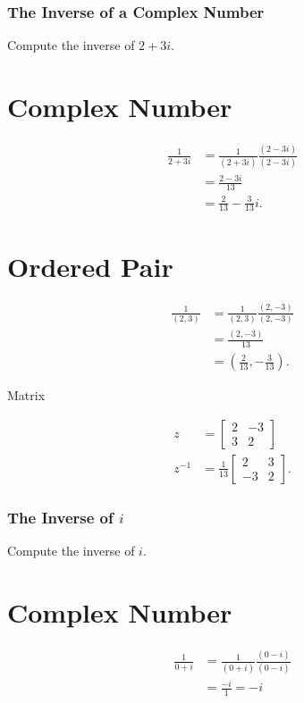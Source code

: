 \documentclass[10pt]{article}
\begin{document}
\subsubsection{The Inverse of a Complex Number}
Compute the inverse of $2+3 i$.

\section{Complex Number}
$$
\begin{aligned}
\frac{1}{2+3 i} & =\frac{1}{(2+3 i)} \frac{(2-3 i)}{(2-3 i)} \\
& =\frac{2-3 i}{13} \\
& =\frac{2}{13}-\frac{3}{13} i .
\end{aligned}
$$

\section{Ordered Pair}
$$
\begin{aligned}
\frac{1}{(2,3)} & =\frac{1}{(2,3)} \frac{(2,-3)}{(2,-3)} \\
& =\frac{(2,-3)}{13} \\
& =\left(\frac{2}{13},-\frac{3}{13}\right) .
\end{aligned}
$$

Matrix

$$
\begin{aligned}
z & =\left[\begin{array}{lc}
2 & -3 \\
3 & 2
\end{array}\right] \\
z^{-1} & =\frac{1}{13}\left[\begin{array}{cc}
2 & 3 \\
-3 & 2
\end{array}\right] .
\end{aligned}
$$

\subsubsection{The Inverse of $i$}
Compute the inverse of $i$.

\section{Complex Number}
$$
\begin{aligned}
\frac{1}{0+i} & =\frac{1}{(0+i)} \frac{(0-i)}{(0-i)} \\
& =\frac{-i}{1}=-i
\end{aligned}
$$
\end{document}
